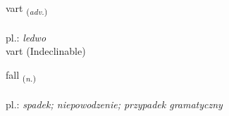 \documentclass[frontgrid, backgrid]{flacards}\usepackage[]{graphicx}\usepackage[]{xcolor}
\begin{document}

\renewcommand{\flhead}{\vskip5pt \fboxsep=0pt {\small\bfseries\footnotesize Atviksorð | Adverb}}
\renewcommand{\fcfoot}{\vskip5pt \fboxsep=0pt \hspace{2pt}{\small\bfseries\footnotesize 2K}}

\renewcommand{\blhead}{\vskip5pt {\small\bfseries\footnotesize Atviksorð | Adverb }}
\renewcommand{\bcfoot}{\vskip5pt \hspace{2pt}{\small\bfseries\footnotesize 2K}}


{vart \small{\textsubscript{(\textit{adv.})}} \\[1ex]
\textphonetic{[var̥t]} \\
pl.: \emph{ledwo} \\  [2ex]
vart (Indeclinable)}

\renewcommand{\flhead}{\vskip5pt \fboxsep=0pt {\small\bfseries\footnotesize Nafnorð | Noun}}
\renewcommand{\fcfoot}{\vskip5pt \fboxsep=0pt \hspace{2pt}{\small\bfseries\footnotesize 2K}}

\renewcommand{\blhead}{\vskip5pt {\small\bfseries\footnotesize Nafnorð | Noun }}
\renewcommand{\bcfoot}{\vskip5pt \hspace{2pt}{\small\bfseries\footnotesize 2K}}


{fall \small{\textsubscript{(\textit{n.})}} \\[1ex] %
\textphonetic{[fatl̥]} \\
pl.: \emph{spadek; niepowodzenie; przypadek gramatyczny} \\  [2ex]
\renewcommand*{\arraystretch}{0.8}
}

\renewcommand{\flhead}{\vskip5pt \fboxsep=0pt {\small\bfseries\footnotesize Nafnorð | Noun}}
\renewcommand{\fcfoot}{\vskip5pt \fboxsep=0pt \hspace{2pt}{\small\bfseries\footnotesize 2K}}
\end{document}
